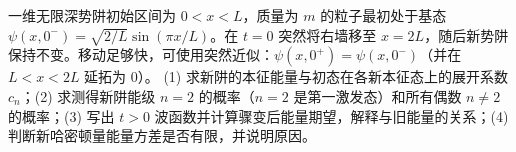 一维无限深势阱初始区间为 \(0<x<L\)，质量为 \(m\) 的粒子最初处于基态 \(\psi(x,0^-)=\sqrt{2/L}\sin(\pi x/L)\)。在 \(t=0\) 突然将右墙移至 \(x=2L\)，随后新势阱保持不变。移动足够快，可使用突然近似：\(\psi(x,0^+)=\psi(x,0^-)\)（并在 \(L<x<2L\) 延拓为 \(0\)）。
(1) 求新阱的本征能量与初态在各新本征态上的展开系数 \(c_n\)；(2) 求测得新阱能级 \(n=2\) 的概率（\(n=2\) 是第一激发态）和所有偶数 \(n\ne2\) 的概率；(3) 写出 \(t>0\) 波函数并计算骤变后能量期望，解释与旧能量的关系；(4) 判断新哈密顿量能量方差是否有限，并说明原因。
